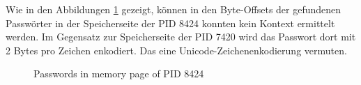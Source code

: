 Wie in den Abbildungen \ref{img:firefox-pw-offset-pid-8424} gezeigt, können in den Byte-Offsets der gefundenen Passwörter in der Speicherseite der PID 8424 konnten kein Kontext ermittelt werden. Im Gegensatz zur Speicherseite der PID 7420 wird das Passwort dort mit 2 Bytes pro Zeichen enkodiert. Das eine Unicode-Zeichenenkodierung vermuten.
\begin{figure}
	\centering
	\hfill
	\label{img:firefox-pw-offset-pid-8424}  
	\caption{Passwords in memory page of PID 8424}
\end{figure}

